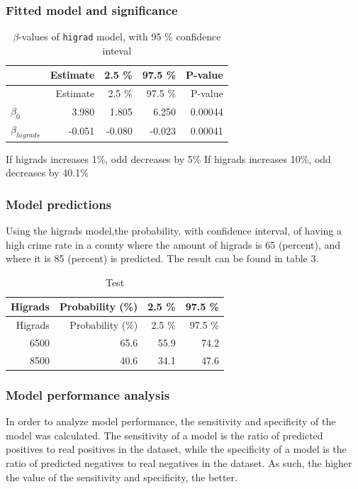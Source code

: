 \documentclass[a4paper]{article}
\begin{document}
\hypertarget{fitted-model-and-significance}{%
\subsubsection{Fitted model and
significance}\label{fitted-model-and-significance}}

\begin{longtable}[]{@{}lrrrr@{}}
\caption{\label{tab:higrad_beta}\(\beta\)-values of \texttt{higrad}
model, with 95 \% confidence inteval}\tabularnewline
\toprule
& Estimate & 2.5 \% & 97.5 \% & P-value\tabularnewline
\midrule
\endfirsthead
\toprule
& Estimate & 2.5 \% & 97.5 \% & P-value\tabularnewline
\midrule
\endhead
\(\beta_0\) & 3.980 & 1.805 & 6.250 & 0.00044\tabularnewline
\(\beta_{higrads}\) & -0.051 & -0.080 & -0.023 & 0.00041\tabularnewline
\bottomrule
\end{longtable}

If higrads increases 1\%, odd decreases by 5\% If higrads increases
10\%, odd decreases by 40.1\%

\hypertarget{model-predictions}{%
\subsubsection{Model predictions}\label{model-predictions}}

Using the higrads model,the probability, with confidence interval, of
having a high crime rate in a county where the amount of higrads is 65
(percent), and where it is 85 (percent) is predicted. The result can be
found in table 3.

\begin{longtable}[]{@{}rrrr@{}}
\caption{Test}\tabularnewline
\toprule
Higrads & Probability (\%) & 2.5 \% & 97.5 \%\tabularnewline
\midrule
\endfirsthead
\toprule
Higrads & Probability (\%) & 2.5 \% & 97.5 \%\tabularnewline
\midrule
\endhead
6500 & 65.6 & 55.9 & 74.2\tabularnewline
8500 & 40.6 & 34.1 & 47.6\tabularnewline
\bottomrule
\end{longtable}

\hypertarget{model-performance-analysis}{%
\subsubsection{Model performance
analysis}\label{model-performance-analysis}}

In order to analyze model performance, the sensitivity and specificity
of the model was calculated. The sensitivity of a model is the ratio of
predicted positives to real positives in the dataset, while the
specificity of a model is the ratio of predicted negatives to real
negatives in the dataset. As such, the higher the value of the
sensitivity and specificity, the better.
\end{document}
